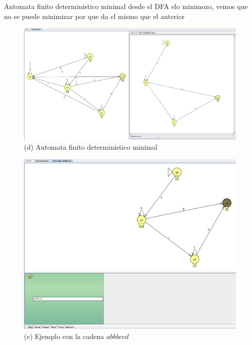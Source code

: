 \documentclass{article}
\begin{document}
        Automata finito deterministico minimal
        desde el DFA elo minimozo, vemos que no se puede minimizar por que da el mismo que el anterior
        \begin{figure}[!h]
            \centering
            \includegraphics[width=1.2\textwidth]{./Imagenes/image12.png}
            \caption*{(d) Automata finito deterministico minimal}
            \label{fig:label4}
        \end{figure}

        \newpage 
        \begin{figure}[!h]
            \centering
            \includegraphics[width=1.2\textwidth]{./Imagenes/image13.png}
            \caption*{(e) Ejemplo con la cadena $abbbccd$}
            \label{fig:label4}
        \end{figure}



            
\end{document}
